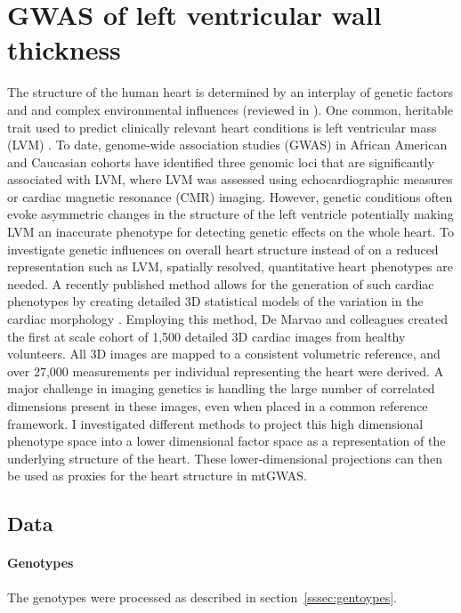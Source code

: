 \section{GWAS of left ventricular wall thickness}
\label{section:GWAS_pheno3D}
The structure of the human heart is determined by an interplay of genetic factors and and complex environmental influences (reviewed in \citep{Payne1995, Sanoudou2005, O'Toole2008}). One common, heritable trait used to predict clinically relevant heart conditions is left ventricular mass (LVM) \citep{Post1997}. To date, genome-wide association studies (GWAS) in African American \citep{Fox2013} and Caucasian cohorts \citep{Vasan2007, Vasan2009, Arnett2009} have identified three genomic loci that are significantly associated with LVM, where LVM was assessed using echocardiographic measures or cardiac magnetic resonance (CMR) imaging. However, genetic conditions often evoke asymmetric changes in the structure of the left ventricle \citep{Chen1999, VanderMerwe2008} potentially making LVM an inaccurate phenotype for detecting genetic effects on the whole heart. To investigate genetic influences on overall heart structure instead of on a reduced representation such as LVM, spatially resolved, quantitative heart phenotypes are needed. 
A recently published method allows for the generation of such cardiac phenotypes by creating detailed 3D statistical models of the variation in the cardiac morphology \citep{DeMarvao2014}. Employing this method, De Marvao and colleagues created the first at scale cohort of 1,500 detailed 3D cardiac images from healthy volunteers.
All 3D images are mapped to a consistent volumetric reference, and over 27,000 measurements per individual representing the heart were derived. A major challenge in imaging genetics is handling the large number of correlated dimensions present in these images, even when placed in a common reference framework.  I investigated different methods to project this high dimensional phenotype space into a lower dimensional factor space as a representation of the underlying structure of the heart. These lower-dimensional projections can then be used as proxies for the heart structure in mtGWAS.

\subsection{Data}
\paragraph{Genotypes}
The genotypes were processed as described in section~\ref{sssec:gentoypes}. 
